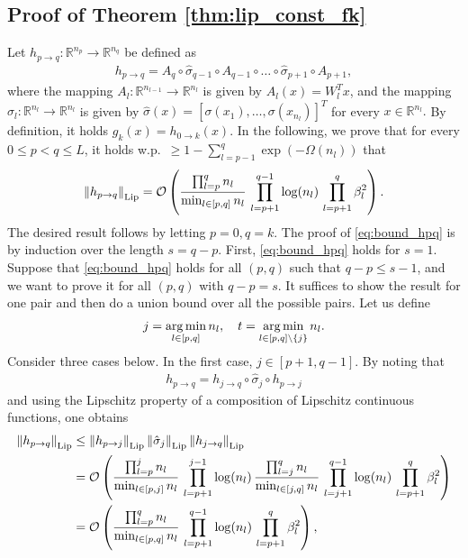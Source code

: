 \documentclass[11pt]{article}
\def\RR{\mathbb{R}}
\def\Set#1{\left\{ #1 \right\}}
\newenvironment{proof}{\par\noindent{\bf Proof:\ }}{\hfill$\Box$\\[2mm]}
\newcommand{\bigO}[1]{\mathcal{O}\left(#1\right)}
\newcommand{\bigOmg}[1]{\Omega\left(#1\right)}
\newcommand{\bigexp}[1]{\exp\left(#1\right)}
\newcommand{\norm}[1]{\left\|#1\right\|}
\def\Lip{\mathrm{Lip}}
\def\argmin{\mathop{\rm arg\,min}\limits}
\def\min{\mathop{\rm min}\nolimits}
\begin{document}
\subsection{Proof of Theorem \ref{thm:lip_const_fk}}\label{app:thm:lip_const_fk}
    Let $h_{p\to q}:\RR^{n_p}\to\RR^{n_q}$ be defined as
    \begin{align*}
	h_{p\to q} = A_q\circ\hat{\sigma}_{q-1}\circ A_{q-1}\circ \ldots\circ\hat{\sigma}_{p+1}\circ A_{p+1} ,
    \end{align*}
    where the mapping $A_l:\RR^{n_{l-1}}\to\RR^{n_l}$ is given by $A_l(x)=W_l^T x$,
    and the mapping $\hat{\sigma}_l:\RR^{n_l}\to\RR^{n_l}$ is given by $\hat{\sigma}(x)=[\sigma(x_1),\ldots,\sigma(x_{n_l})]^T$ for every $x\in\RR^{n_l}.$
    By definition, it holds $g_k(x)=h_{0\to k}(x).$
    In the following, we prove that for every $0\leq p<q\leq L$, 
    it holds w.p.\ $\geq 1-\sum_{l=p-1}^{q}\bigexp{-\bigOmg{n_l}}$ that
    \begin{align}\label{eq:bound_hpq}
	\norm{h_{p\to q}}_{\Lip}
	=\bigO{ \frac{\prod_{l=p}^{q} n_l}{\min_{l\in[p,q]}n_l}\, \prod_{l=p+1}^{q-1}\log(n_l)\, \prod_{l=p+1}^{q}\beta_l^2} .
    \end{align}
    The desired result follows by letting $p=0, q=k$.
    The proof of \eqref{eq:bound_hpq} is by induction over the length $s=q-p$.
    First, \eqref{eq:bound_hpq} holds for $s=1.$
    Suppose that \eqref{eq:bound_hpq} holds for all $(p, q)$ such that $q-p\le s-1$, 
    and we want to prove it for all $(p,q)$ with $q-p=s$. 
    It suffices to show the result for one pair and then do a union bound over all the possible pairs.
    Let us define 
    \begin{align*}
	j=\argmin_{l\in[p,q]} n_l,\quad t=\argmin_{l\in[p,q]\setminus\Set{j}} n_l.
    \end{align*}
    Consider three cases below. 
    In the first case, $j\in[p+1,q-1]$. By noting that
    \begin{align*}
	h_{p\to q}=h_{j\to q} \circ \hat{\sigma}_j \circ h_{p\to j}
    \end{align*}
    and using the Lipschitz property of a composition of Lipschitz continuous functions, one obtains
    \begin{align*}
	\norm{h_{p\to q}}_{\Lip}
	&\leq \norm{h_{p\to j}}_{\Lip} \norm{\hat{\sigma}_{j}}_{\Lip} \norm{h_{j\to q}}_{\Lip} \\
	&=\bigO{ \frac{\prod_{l=p}^{j} n_l}{\min_{l\in[p,j]}n_l}\, \prod_{l=p+1}^{j-1}\log(n_l)\, \frac{\prod_{l=j}^q n_l}{\min_{l\in[j,q]}n_l}\, \prod_{l=j+1}^{q-1}\log(n_l)\, \prod_{l=p+1}^{q}\beta_l^2}\\
	&=\bigO{ \frac{\prod_{l=p}^q n_l}{\min_{l\in[p,q]}n_l}\, \prod_{l=p+1}^{q-1}\log(n_l)\, \prod_{l=p+1}^{q}\beta_l^2 } ,
    \end{align*}
\end{document}
